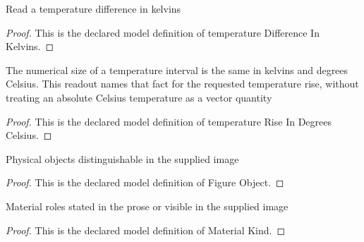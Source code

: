 \begin{definition}
  \label{def:physics:phyx-mini-0486:phyxminiproblems-problemphyxmini0486-temperaturedifferenceinkelvins}
  Read a temperature difference in kelvins
\end{definition}
\begin{proof}
  This is the declared model definition of temperature Difference In Kelvins.
\end{proof}
\begin{definition}
  \label{def:physics:phyx-mini-0486:phyxminiproblems-problemphyxmini0486-temperatureriseindegreescelsius}
  The numerical size of a temperature interval is the same in kelvins and degrees Celsius. This readout names that fact for the requested temperature rise, without treating an absolute Celsius temperature as a vector quantity
\end{definition}
\begin{proof}
  This is the declared model definition of temperature Rise In Degrees Celsius.
\end{proof}
\begin{definition}
  \label{def:physics:phyx-mini-0486:phyxminiproblems-problemphyxmini0486-figureobject}
  Physical objects distinguishable in the supplied image
\end{definition}
\begin{proof}
  This is the declared model definition of Figure Object.
\end{proof}
\begin{definition}
  \label{def:physics:phyx-mini-0486:phyxminiproblems-problemphyxmini0486-materialkind}
  Material roles stated in the prose or visible in the supplied image
\end{definition}
\begin{proof}
  This is the declared model definition of Material Kind.
\end{proof}
